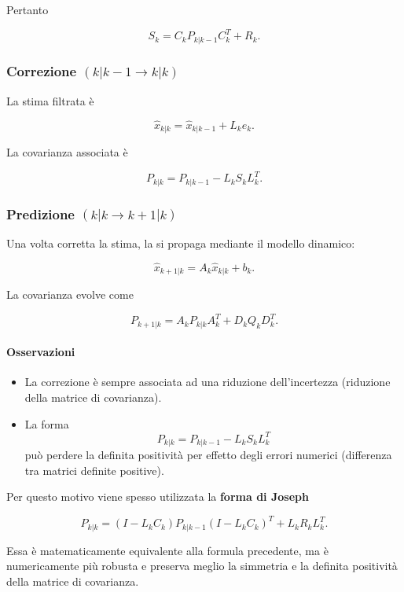 \documentclass[11pt,a4paper]{article}
\begin{document}
Pertanto

\[
\boxed{
S_k
=
C_kP_{k|k-1}C_k^T+R_k.
}
\]

\subsubsection*{Correzione \texorpdfstring{$(k|k-1\rightarrow k|k)$}{(k|k-1 -> k|k)}}

La stima filtrata è

\[
\boxed{
\hat{x}_{k|k}
=
\hat{x}_{k|k-1}
+
L_ke_k.
}
\]

La covarianza associata è

\[
\boxed{
P_{k|k}
=
P_{k|k-1}
-
L_kS_kL_k^T.
}
\]

\subsubsection*{Predizione \texorpdfstring{$(k|k\rightarrow k+1|k)$}{(k|k -> k+1|k)}}

Una volta corretta la stima, la si propaga mediante il modello dinamico:

\[
\boxed{
\hat{x}_{k+1|k}
=
A_k\hat{x}_{k|k}
+
b_k.
}
\]

La covarianza evolve come

\[
\boxed{
P_{k+1|k}
=
A_kP_{k|k}A_k^T
+
D_kQ_kD_k^T.
}
\]

\paragraph{Osservazioni}

\begin{itemize}
    \item La correzione è sempre associata ad una riduzione dell'incertezza (riduzione della matrice di covarianza).
    \item La forma
    \[
    P_{k|k}
    =
    P_{k|k-1}
    -
    L_kS_kL_k^T
    \]
    può perdere la definita positività per effetto degli errori numerici (differenza tra matrici definite positive).
\end{itemize}

Per questo motivo viene spesso utilizzata la \textbf{forma di Joseph}

\[
\boxed{
P_{k|k}
=
(I-L_kC_k)
P_{k|k-1}
(I-L_kC_k)^T
+
L_kR_kL_k^T.
}
\]

Essa è matematicamente equivalente alla formula precedente, ma è numericamente più robusta e preserva meglio la simmetria e la definita positività della matrice di covarianza.
\end{document}
